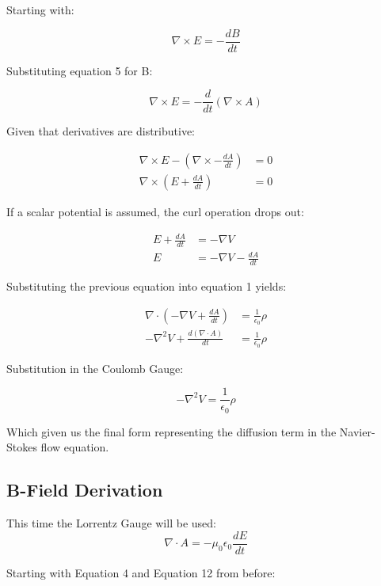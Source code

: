 \documentclass[12pt,a4paper]{article}
\begin{document}
Starting with:

\begin{equation}
\nabla \times E = -\frac{dB}{dt}
\end{equation}

Substituting equation 5 for B:

\begin{equation}
\nabla \times E = -\frac{d}{dt}(\nabla \times A)
\end{equation}

Given that derivatives are distributive:

\begin{align}
\nabla \times E - (\nabla \times -\frac{dA}{dt}) &= 0\\
\nabla \times (E +\frac{dA}{dt}) &= 0
\end{align}

If a scalar potential is assumed, the curl operation drops out:

\begin{align}
E +\frac{dA}{dt} &= -\nabla V \\
E &= -\nabla V - \frac{dA}{dt} 
\end{align}

Substituting the previous equation into equation 1 yields:

\begin{align}
\nabla \cdot (-\nabla V + \frac{dA}{dt}) &= \frac{1}{\epsilon_0} \rho \\
-\nabla^{2} V + \frac{d(\nabla \cdot A)}{dt} &= \frac{1}{\epsilon_0} \rho
\end{align}

Substitution in the Coulomb Gauge:

\begin{equation}
-\nabla^{2} V = \frac{1}{\epsilon_0} \rho
\end{equation}

Which given us the final form representing the diffusion term in the Navier-Stokes flow equation.

\subsection{B-Field Derivation}
This time the Lorrentz Gauge will be used:
\begin{equation}
\nabla \cdot A = -\mu_0 \epsilon_0 \frac{dE}{dt}
\end{equation}

Starting with Equation 4 and Equation 12 from before:
\end{document}
